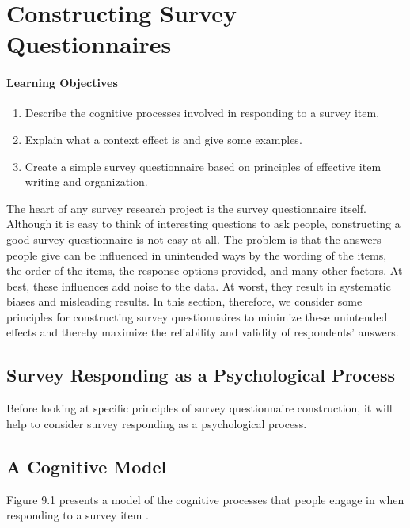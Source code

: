 \newpage
\section{Constructing Survey Questionnaires}

\paragraph{Learning Objectives}
 \begin{enumerate}
 \item  Describe the cognitive processes involved in responding to a survey item.
 \item Explain what a context effect is and give some examples.
 \item Create a simple survey questionnaire based on principles of effective item writing and organization.

   \end{enumerate}


The heart of any survey research project is the survey questionnaire itself. Although it is easy to think of interesting questions to ask people, constructing a good survey questionnaire is not easy at all. The problem is that the answers people give can be influenced in unintended ways by the wording of the items, the order of the items, the response options provided, and many other factors. At best, these influences add noise to the data. At worst, they result in systematic biases and misleading results. In this section, therefore, we consider some principles for constructing survey questionnaires to minimize these unintended effects and thereby maximize the reliability and validity of respondents’ answers.

\subsection{Survey Responding as a Psychological Process}

Before looking at specific principles of survey questionnaire construction, it will help to consider survey responding as a psychological process.

\subsection{A Cognitive Model}

Figure 9.1 presents a model of the cognitive processes that people engage in when responding to a survey item \citep{sudman_thinking_1996}.


